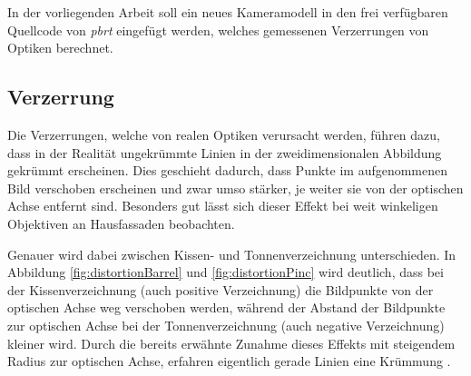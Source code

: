 In der vorliegenden Arbeit soll ein neues Kameramodell in den frei verfügbaren Quellcode von \textit{pbrt} eingefügt werden, welches gemessenen Verzerrungen von Optiken berechnet.

\subsection{Verzerrung}

Die Verzerrungen, welche von realen Optiken verursacht werden, führen dazu, dass in der Realität ungekrümmte Linien in der zweidimensionalen Abbildung gekrümmt erscheinen. Dies geschieht dadurch, dass Punkte im aufgenommenen Bild verschoben erscheinen und zwar umso stärker, je weiter sie von der optischen Achse entfernt sind. Besonders gut lässt sich dieser Effekt bei weit winkeligen Objektiven an Hausfassaden beobachten. 

Genauer wird dabei zwischen Kissen- und Tonnenverzeichnung unterschieden. In Abbildung \ref{fig:distortionBarrel} und \ref{fig:distortionPinc} wird deutlich, dass bei der Kissenverzeichnung (auch positive Verzeichnung) die Bildpunkte von der optischen Achse weg verschoben werden, während der Abstand der Bildpunkte zur optischen Achse bei der Tonnenverzeichnung (auch negative Verzeichnung) kleiner wird. Durch die bereits erwähnte Zunahme dieses Effekts mit steigendem Radius zur optischen Achse, erfahren eigentlich gerade Linien eine Krümmung \cite{smith2000modern}.

